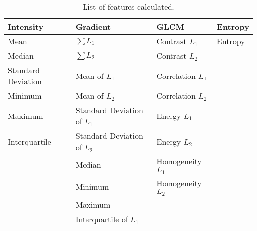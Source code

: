 \begin{table}[H]
\centering
\caption{List of features calculated.}

\begin{tabular}{|l|l|l|l|}
\hline
\textbf{Intensity} & \textbf{Gradient} & \textbf{GLCM} & \textbf{Entropy}\\
\hline
Mean					 &	$\sum L_1$ 					&	Contrast $L_1$		&	Entropy\\
Median				 &	$\sum L_2$					&	Contrast $L_2$		&\\
Standard Deviation	 &  Mean of $L_1$				&	Correlation $L_1$	&\\
Minimum 				 &	Mean of $L_2$				& 	Correlation $L_2$	&\\
Maximum 				 &  	Standard Deviation of $L_1$ 	&	Energy $L_1$		 	&\\ 
Interquartile		 &  Standard Deviation of $L_2$	&	Energy $L_2$			&\\
				     &  Median 						& 	Homogeneity $L_1$	&\\
				   	 &  Minimum						& 	Homogeneity $L_2$	&\\
				    	 & 	Maximum 						& 						&\\ 
				    	 &	Interquartile of $L_1$		&						&\\
\hline				    	 			   			    	 
\end{tabular}
\label{table: feature}

\end{table}